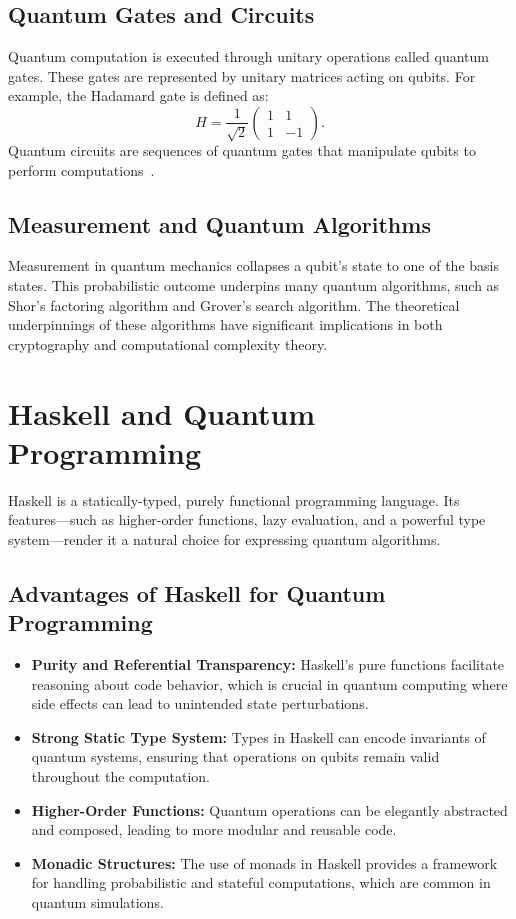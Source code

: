 \documentclass[12pt]{article}
\begin{document}
\subsection{Quantum Gates and Circuits}
Quantum computation is executed through unitary operations called quantum gates. These gates are represented by unitary matrices acting on qubits. For example, the Hadamard gate is defined as:
\[
H = \frac{1}{\sqrt{2}}
\begin{pmatrix}
1 & 1 \\
1 & -1
\end{pmatrix}.
\]
Quantum circuits are sequences of quantum gates that manipulate qubits to perform computations~\cite{nielsen2000quantum}.

\subsection{Measurement and Quantum Algorithms}
Measurement in quantum mechanics collapses a qubit's state to one of the basis states. This probabilistic outcome underpins many quantum algorithms, such as Shor's factoring algorithm and Grover's search algorithm. The theoretical underpinnings of these algorithms have significant implications in both cryptography and computational complexity theory.

\section{Haskell and Quantum Programming}
\label{sec:haskell}
Haskell is a statically-typed, purely functional programming language. Its features—such as higher-order functions, lazy evaluation, and a powerful type system—render it a natural choice for expressing quantum algorithms.

\subsection{Advantages of Haskell for Quantum Programming}
\begin{itemize}
    \item \textbf{Purity and Referential Transparency:} Haskell's pure functions facilitate reasoning about code behavior, which is crucial in quantum computing where side effects can lead to unintended state perturbations.
    \item \textbf{Strong Static Type System:} Types in Haskell can encode invariants of quantum systems, ensuring that operations on qubits remain valid throughout the computation.
    \item \textbf{Higher-Order Functions:} Quantum operations can be elegantly abstracted and composed, leading to more modular and reusable code.
    \item \textbf{Monadic Structures:} The use of monads in Haskell provides a framework for handling probabilistic and stateful computations, which are common in quantum simulations.
\end{itemize}
\end{document}
